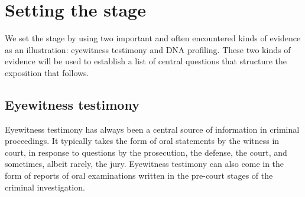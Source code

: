 \documentclass[10pt]{article}
\begin{document}

\section{Setting the stage}

We set the stage by using two important and often encountered kinds of evidence as an illustration: eyewitness testimony and DNA profiling. 
These two kinds of evidence will be used to establish a list of central questions that structure the exposition that follows.

\subsection{Eyewitness testimony}

Eyewitness testimony has always been a central source of information in criminal proceedings. It typically takes the form of 
oral statements by the witness in court, in response to questions by the prosecution, the defense, the court, and sometimes, albeit rarely, the jury. 
Eyewitness testimony can also come in the form of reports of oral 
examinations written in the pre-court stages of the criminal investigation. %
\end{document}
